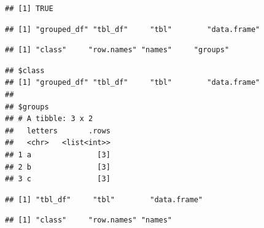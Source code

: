 \documentclass[krantz2]{krantz}\usepackage{knitr}
\begin{document}
\begin{warningbox}
\begin{knitrout}\footnotesize
{}\color{fgcolor}\begin{kframe}
\begin{alltt}
 \hlkwb{<-} \hlstd{(} 
\end{alltt}
\begin{verbatim}
## [1] TRUE
\end{verbatim}
\begin{alltt}
\end{alltt}
\begin{verbatim}
## [1] "grouped_df" "tbl_df"     "tbl"        "data.frame"
\end{verbatim}
\end{kframe}
\end{knitrout}
\begin{knitrout}\footnotesize
{}\color{fgcolor}\begin{kframe}
\begin{alltt}
\hlstd{(}
\end{alltt}
\begin{verbatim}
## [1] "class"     "row.names" "names"     "groups"
\end{verbatim}
\begin{alltt}
\hlstd{(} 
\end{alltt}
\begin{verbatim}
## $class
## [1] "grouped_df" "tbl_df"     "tbl"        "data.frame"
## 
## $groups
## # A tibble: 3 x 2
##   letters       .rows
##   <chr>   <list<int>>
## 1 a               [3]
## 2 b               [3]
## 3 c               [3]
\end{verbatim}
\end{kframe}
\end{knitrout}

\begin{knitrout}\footnotesize
{}\color{fgcolor}\begin{kframe}
\begin{alltt}
 \hlkwb{<-} 
\end{alltt}
\begin{verbatim}
## [1] "tbl_df"     "tbl"        "data.frame"
\end{verbatim}
\begin{alltt}
\hlstd{(}
\end{alltt}
\begin{verbatim}
## [1] "class"     "row.names" "names"
\end{verbatim}
\end{kframe}
\end{knitrout}


\end{warningbox}
\end{document}
